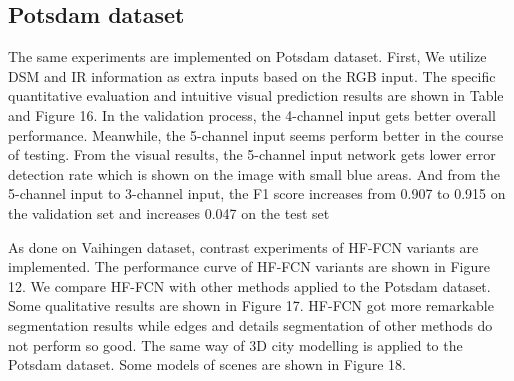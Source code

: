 \subsection{Potsdam dataset}
 The same experiments are implemented on Potsdam dataset. First, We utilize DSM and IR information as extra inputs based on the RGB input. The specific quantitative evaluation and intuitive visual prediction results are shown in Table and Figure 16. In the validation process, the 4-channel input gets better overall performance. Meanwhile, the 5-channel input seems perform better in the course of testing. From the visual results, the 5-channel input network gets lower error detection rate which is shown on the image with small blue areas. And from the 5-channel input to 3-channel input, the F1 score increases from 0.907 to 0.915 on the validation set and increases 0.047 on the test set \par
 \setlength{\parindent}{2ex} As done on Vaihingen dataset, contrast experiments of HF-FCN variants are implemented. The performance curve of HF-FCN variants are shown in Figure 12. We compare HF-FCN with other methods applied to the Potsdam dataset. Some qualitative results are shown in Figure 17. HF-FCN got more remarkable segmentation results while edges and details segmentation of other methods do not perform so good. The same way of 3D city modelling is applied to the Potsdam dataset. Some models of scenes are shown in Figure 18.

